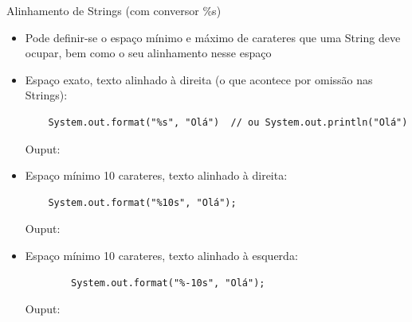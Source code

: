 \documentclass[portuguese, aspectratio=169, xcolor=table]{beamer}
\begin{document}
\begin{frame}[fragile]{Alinhamento de Strings (com conversor {\color{red}\%s})}
\begin{itemize}
    \item Pode definir-se o espaço mínimo e máximo de carateres que uma String deve ocupar, bem como o seu alinhamento nesse espaço
    \item Espaço exato, texto alinhado à direita (o que acontece por omissão nas Strings):
    \begin{verbatim}
    System.out.format("%s", "Olá")  // ou System.out.println("Olá")
    \end{verbatim}
    Ouput: 
    \item Espaço mínimo 10 carateres, texto alinhado à direita:
    \begin{verbatim}
    System.out.format("%10s", "Olá");
    \end{verbatim}
    Ouput: 
    \item Espaço mínimo 10 carateres, texto alinhado à esquerda:
    \begin{verbatim}
        System.out.format("%-10s", "Olá");
    \end{verbatim}
    Ouput: 
\end{itemize}
\end{frame}
\end{document}
